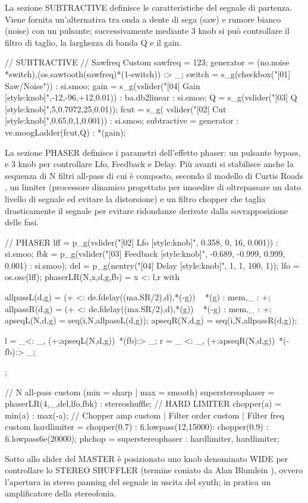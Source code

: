\documentclass[
	a4paper,
	twocolumn
	]{article}
\begin{document}
La sezione SUBTRACTIVE definisce le caratteristiche del segnale di partenza.
Viene fornita un'alternativa tra onda a dente di sega (saw) e rumore bianco
(noise) con un pulsante; successivamente mediante 3 knob si può controllare il
filtro di taglio, la larghezza di banda Q e il gain.

// SUBTRACTIVE
// Sawfreq Custom
sawfreq = 123;
generator = (no.noise *switch),(os.sawtooth(sawfreq)*(1-switch)) :> _;
switch = s_g(checkbox("[01] Saw/Noise")) : si.smoo;
gain = s_g(vslider("[04] Gain [style:knob]",-12,-96,+12,0.01)) : ba.db2linear
			: si.smoo;
Q = s_g(vslider("[03] Q [style:knob]",5,0.7072,25,0.01));
fcut = s_g( vslider("[02] Cut [style:knob]",0.65,0,1,0.001)) : si.smoo;
subtractive = generator : ve.moogLadder(fcut,Q) : *(gain);

La sezione PHASER definisce i parametri dell'effetto phaser: un pulsante bypass,
e 3 knob per controllare Lfo, Feedback e Delay. Più avanti si stabilisce anche
la sequenza di N filtri all-pass di cui è composto, secondo il modello di Curtis
Roads \cite{cr96cmt}, un limiter (processore dinamico progettato per imoedire di
oltrepassare un dato livello di segnale ed evitare la distorsione) e un filtro
chopper che taglia drasticamente il segnale per evitare ridondanze derivate
dalla sovrapposizione delle fasi.

// PHASER
lff = p_g(vslider("[02] Lfo [style:knob]", 0.358, 0, 16, 0.001)) : si.smoo;
fbk = p_g(vslider("[03] Feedback [style:knob]", -0.689, -0.999, 0.999, 0.001)
			: si.smoo);
del = p_g(nentry("[04] Delay [style:knob]", 1, 1, 100, 1));
lfo = os.osc(lff);
phaserLR(N,x,d,g,fb) = x <: l,r
with{
  allpassL(d,g) = (+ <: de.fdelay((ma.SR/2),d),*(-g)) ~ *(g) : mem,_ : +;
  allpassR(d,g) = (+ <: de.fdelay((ma.SR/2),d),*(g)) ~ *(-g) : mem,_ : +;
  apseqL(N,d,g) = seq(i,N,allpassL(d,g));
  apseqR(N,d,g) = seq(i,N,allpassR(d,g));

  l = _<: _, (+:apseqL(N,d,g))~*(fb):> _;
  r = _ <: _, (+:apseqR(N,d,g))~*(-fb):> _;
};

// N all-pass custom (min = sharp | max = smooth)
superstereophaser = phaserLR(4,_,del,lfo,fbk) : stereoshuffle;
// HARD LIMITER
chopper(a) = min(a) : max(-a);
// Chopper amp custom | Filter order custom | Filter freq custom
hardlimiter = chopper(0.7) : fi.lowpass(12,15000): chopper(0.9) : fi.lowpass6e(20000);
phchop = superstereophaser : hardlimiter, hardlimiter;


Sotto allo slider del MASTER è posizionato uno knob denominato WIDE per
controllare lo STEREO SHUFFLER (termine coniato da Alan Blumlein \cite{ab58} ),
ovvero l'apertura in stereo panning del segnale in uscita del synth; in pratica
un amplificatore della stereofonia.
\end{document}
